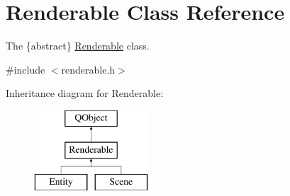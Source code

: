 \hypertarget{class_renderable}{}\section{Renderable Class Reference}
\label{class_renderable}


The \{abstract\} \hyperlink{class_renderable}{Renderable} class.  




{\ttfamily \#include $<$renderable.\+h$>$}

Inheritance diagram for Renderable\+:\begin{figure}[H]
\begin{center}
\leavevmode
\includegraphics[height=3.000000cm]{class_renderable}
\end{center}
\end{figure}
